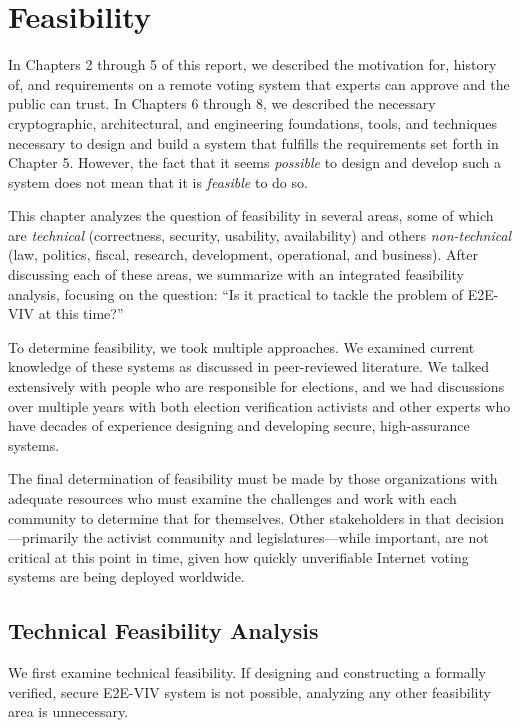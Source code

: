 \chapter{Feasibility}
\label{chapter:feasibility}

In Chapters 2 through 5 of this report, we described the motivation
for, history of, and requirements on a remote voting system that
experts can approve and the public can trust. In Chapters 6
through 8, we described the necessary cryptographic, architectural,
and engineering foundations, tools, and techniques necessary to design
and build a system that fulfills the requirements set forth in Chapter
5. However, the fact that it seems \emph{possible} to design and
develop such a system does not mean that it is \emph{feasible} to do
so.

This chapter analyzes the question of feasibility in several areas,
some of which are \emph{technical} (correctness, security, usability,
availability) and others \emph{non-technical} (law, politics, fiscal,
research, development, operational, and business). After discussing
each of these areas, we summarize with an integrated feasibility
analysis, focusing on the question: ``Is it practical to tackle the
problem of E2E-VIV at this time?''

To determine feasibility, we took multiple approaches. We examined
current knowledge of these systems as discussed in peer-reviewed
literature. We talked extensively with people who are responsible for
elections, and we had discussions over multiple years with both
election verification activists and other experts who have decades of
experience designing and developing secure, high-assurance systems.

The final determination of feasibility must be made by those
organizations with adequate resources who must examine the challenges
and work with each community to determine that for themselves.  Other
stakeholders in that decision---primarily the activist community and
legislatures---while important, are not critical at this point in
time, given how quickly unverifiable Internet voting systems are being
deployed worldwide.

\section{Technical Feasibility Analysis}

We first examine technical feasibility. If designing and constructing
a formally verified, secure E2E-VIV system is not possible, analyzing
any other feasibility area is unnecessary.

